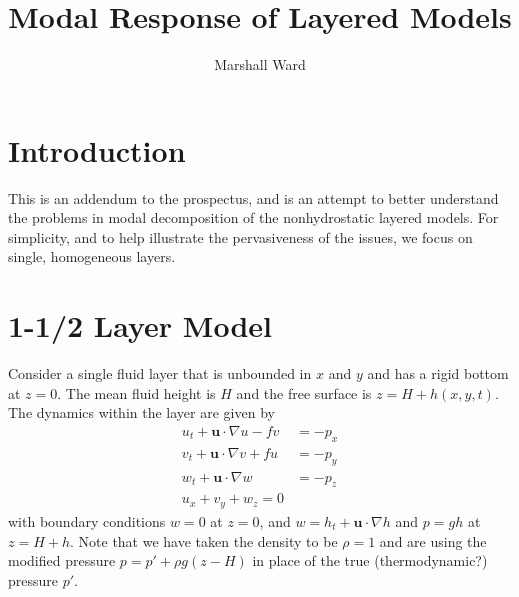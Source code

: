 \documentclass[letterpaper, 11pt]{article}
\title{Modal Response of Layered Models}
\author{Marshall Ward}
\begin{document}
\maketitle


\section{Introduction}

This is an addendum to the prospectus, and is an attempt to better understand the problems in modal decomposition of the nonhydrostatic layered models. For simplicity, and to help illustrate the pervasiveness of the issues, we focus on single, homogeneous layers.


\section{1-1/2 Layer Model}

Consider a single fluid layer that is unbounded in $x$ and $y$ and has a rigid bottom at $z = 0$. The mean fluid height is $H$ and the free surface is $z = H + h(x, y, t)$. The dynamics within the layer are given by
\begin{subequations}
\begin{align}
u_t + \mathbf{u} \cdot \nabla u - f v &= -p_x \\
v_t + \mathbf{u} \cdot \nabla v + f u &= -p_y \\
w_t + \mathbf{u} \cdot \nabla w &= -p_z \\
u_x + v_y + w_z = 0
\end{align}
\end{subequations}
with boundary conditions $w = 0$ at $z = 0$, and $w = h_t + \mathbf{u} \cdot \nabla h$ and $p = g h$ at $z = H + h$. Note that we have taken the density to be $\rho = 1$ and are using the modified pressure $p = p' + \rho g (z - H)$ in place of the true (thermodynamic?) pressure $p'$.
\end{document}
